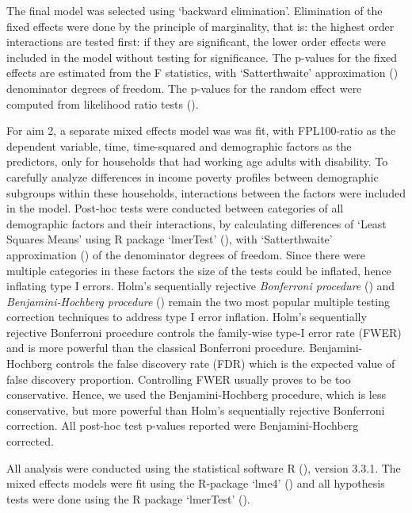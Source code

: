 \documentclass[11pt]{extarticle} %
\begin{document}
The final model was selected using `backward elimination'. Elimination of the fixed effects were done by the principle of marginality, that is: the highest order interactions are tested first: if they are significant, the lower order effects were included in the model without testing for significance. The p-values for the fixed effects are estimated from the F statistics, with `Satterthwaite' approximation (\cite{Satterthwaite_1946_Biometrics}) denominator degrees of freedom. The p-values for the random effect were computed from likelihood ratio tests (\cite{Morrell_1998_Biometrics}). 

For aim 2, a separate mixed effects model was was fit, with FPL100-ratio as the dependent variable, time, time-squared and demographic factors as the predictors, only for households that had working age adults with disability. To carefully analyze differences in income poverty profiles between demographic subgroups within these households, interactions between the factors were included in the model. Post-hoc tests were conducted between categories of all demographic factors and their interactions, by calculating differences of `Least Squares Means' using R package `lmerTest' (\cite{Kuznetsova_etal_2015_R-lmerTest}), with `Satterthwaite' approximation (\cite{Satterthwaite_1946_Biometrics}) of the denominator degrees of freedom. Since there were multiple categories in these factors the size of the tests could be inflated, hence inflating type I errors. Holm's sequentially rejective {\emph{Bonferroni procedure}} (\cite{Holm_1979_SJS}) and {\emph{Benjamini-Hochberg procedure}} (\cite{Benjamini_Hochberg_1995_JRSSB}) remain the two most popular multiple testing correction techniques to address type I error inflation. Holm's sequentially rejective Bonferroni procedure controls the family-wise type-I error rate (FWER) and is more powerful than the classical Bonferroni procedure. Benjamini-Hochberg controls the false discovery rate (FDR) which is the expected value of false discovery proportion. Controlling FWER usually proves to be too conservative. Hence, we used the Benjamini-Hochberg procedure, which is less conservative, but more powerful than Holm's sequentially rejective Bonferroni correction. All post-hoc test p-values reported were Benjamini-Hochberg corrected.

All analysis were conducted using the statistical software R (\cite{R}), version 3.3.1. The mixed effects models were fit using the R-package `lme4' (\cite{R-lme4}) and all hypothesis tests were done using the R package `lmerTest' (\cite{Kuznetsova_etal_2015_R-lmerTest}). 
\end{document}
